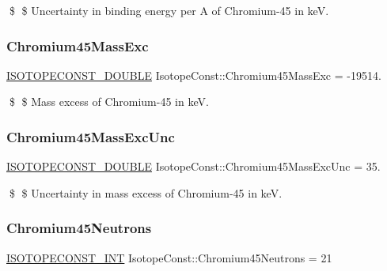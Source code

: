 \$ \$ Uncertainty in binding energy per A of Chromium-\/45 in keV. \mbox{\label{group___isotope_const-_chromium-_cr45_ga1836dacba9cb19e5747f9239fbfcc1e5}} 
\subsubsection{\texorpdfstring{Chromium45\+Mass\+Exc}{Chromium45MassExc}}
{\footnotesize\ttfamily \mbox{\hyperlink{group___isotope_const-_macros_ga8f45a7272ce02c0b4c65c44636ed719a}{I\+S\+O\+T\+O\+P\+E\+C\+O\+N\+S\+T\+\_\+\+D\+O\+U\+B\+LE}} Isotope\+Const\+::\+Chromium45\+Mass\+Exc = -\/19514.}

\$ \$ Mass excess of Chromium-\/45 in keV. \mbox{\label{group___isotope_const-_chromium-_cr45_gac8d10cff86741f5c13244291d0386e94}} 
\subsubsection{\texorpdfstring{Chromium45\+Mass\+Exc\+Unc}{Chromium45MassExcUnc}}
{\footnotesize\ttfamily \mbox{\hyperlink{group___isotope_const-_macros_ga8f45a7272ce02c0b4c65c44636ed719a}{I\+S\+O\+T\+O\+P\+E\+C\+O\+N\+S\+T\+\_\+\+D\+O\+U\+B\+LE}} Isotope\+Const\+::\+Chromium45\+Mass\+Exc\+Unc = 35.}

\$ \$ Uncertainty in mass excess of Chromium-\/45 in keV. \mbox{\label{group___isotope_const-_chromium-_cr45_ga7880c6c9a648105839b5d1eb858c5081}} 
\subsubsection{\texorpdfstring{Chromium45\+Neutrons}{Chromium45Neutrons}}
{\footnotesize\ttfamily \mbox{\hyperlink{group___isotope_const-_macros_ga5f18360b3e99483a35c32d789e62621c}{I\+S\+O\+T\+O\+P\+E\+C\+O\+N\+S\+T\+\_\+\+I\+NT}} Isotope\+Const\+::\+Chromium45\+Neutrons = 21}

